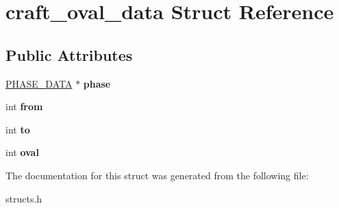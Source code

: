 \hypertarget{structcraft__oval__data}{\section{craft\-\_\-oval\-\_\-data Struct Reference}
\label{structcraft__oval__data}
}
\subsection*{Public Attributes}
\begin{DoxyCompactItemize}
\item 
\hypertarget{structcraft__oval__data_a01211725720787294fae38e5878c7843}{\hyperlink{structphase__data}{P\-H\-A\-S\-E\-\_\-\-D\-A\-T\-A} $\ast$ {\bfseries phase}}\label{structcraft__oval__data_a01211725720787294fae38e5878c7843}

\item 
\hypertarget{structcraft__oval__data_a0ec182de9ea4e17a26deb92c6f745b48}{int {\bfseries from}}\label{structcraft__oval__data_a0ec182de9ea4e17a26deb92c6f745b48}

\item 
\hypertarget{structcraft__oval__data_af57864756ca7e54ebf24ad0ccd8b3a76}{int {\bfseries to}}\label{structcraft__oval__data_af57864756ca7e54ebf24ad0ccd8b3a76}

\item 
\hypertarget{structcraft__oval__data_a067c353bf4cecbdf85c47dcb8064a8e7}{int {\bfseries oval}}\label{structcraft__oval__data_a067c353bf4cecbdf85c47dcb8064a8e7}

\end{DoxyCompactItemize}


The documentation for this struct was generated from the following file\-:\begin{DoxyCompactItemize}
\item 
structs.\-h\end{DoxyCompactItemize}
